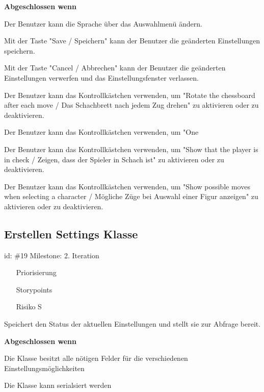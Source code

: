 \textbf{Abgeschlossen wenn}
\begin{todolist}
    \item[\done]  Der Benutzer kann die Sprache über das Auswahlmenü ändern.
  \item[\done]  Mit der Taste "Save / Speichern" kann der Benutzer die geänderten Einstellungen speichern.
  \item[\done]  Mit der Taste "Cancel / Abbrechen" kann der Benutzer die geänderten Einstellungen verwerfen und das Einstellungsfenster verlassen.
  \item[\done]  Der Benutzer kann das Kontrollkästchen verwenden, um "Rotate the chessboard after each move / Das Schachbrett nach jedem Zug drehen" zu aktivieren oder zu deaktivieren.
  \item[\done]  Der Benutzer kann das Kontrollkästchen verwenden, um "One
  \item[\done]  Der Benutzer kann das Kontrollkästchen verwenden, um "Show that the player is in check / Zeigen, dass der Spieler in Schach ist" zu aktivieren oder zu deaktivieren.
  \item[\done]  Der Benutzer kann das Kontrollkästchen verwenden, um "Show possible moves when selecting a character / Mögliche Züge bei Auswahl einer Figur anzeigen" zu aktivieren oder zu deaktivieren.

\end{todolist}


\subsection*{Erstellen Settings Klasse}
id: \#19 Milestone: 2. Iteration\\

\begin{itemize}
\item[Priorisierung] 
\item[Storypoints] 
\item[Risiko] S
\end{itemize}

Speichert den Status der aktuellen Einstellungen und stellt sie zur Abfrage bereit.

\textbf{Abgeschlossen wenn}
\begin{todolist}
    \item[\done]  Die Klasse besitzt alle nötigen Felder für die verschiedenen Einstellungsmöglichkeiten
  \item[\done]  Die Klasse kann serialsiert werden

\end{todolist}


